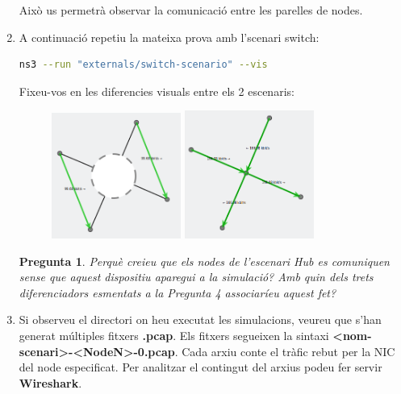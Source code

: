 \documentclass[12pt,a4paper]{article}
\newcounter{exercises}
\newtheorem{exer}[exercises]{Pregunta}
\begin{document}
\begin{enumerate}
Això us permetrà observar la comunicació entre les parelles de nodes.

\item A continuació repetiu la mateixa prova amb l'scenari switch:
\begin{lstlisting}[language=bash]
   ns3 --run "externals/switch-scenario" --vis
\end{lstlisting}

Fixeu-vos en les diferencies visuals entre els 2 escenaris:
\begin{figure}[!ht]
  \begin{center}
    \includegraphics[width=0.4\textwidth]{hub-coms}
    \includegraphics[width=0.4\textwidth]{switch-coms}    
    \label{ns3}
  \end{center}
\end{figure}
\begin{exer} Perquè creieu que els nodes de l'escenari Hub es comuniquen sense que aquest dispositiu aparegui a la simulació? Amb quin dels trets diferenciadors esmentats a la Pregunta 4 associaríeu aquest fet? \end{exer}

\item Si observeu el directori on heu executat les simulacions, veureu que s'han generat múltiples fitxers \textbf{.pcap}. Els fitxers segueixen la sintaxi \textbf{<nom-scenari>-<NodeN>-0.pcap}. Cada arxiu conte el tràfic rebut per la NIC del node especificat. Per analitzar el contingut del arxius podeu fer servir \textbf{Wireshark}. 


\end{enumerate}
\end{document}
